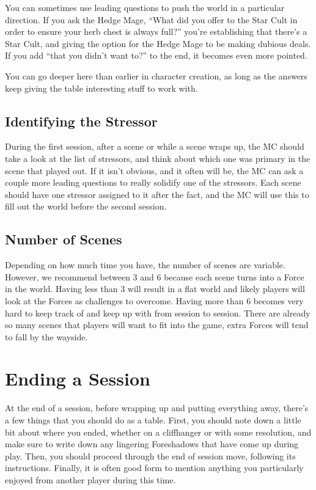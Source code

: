 \documentclass[
]{memoir}
\begin{document}
You can sometimes use leading questions to push the world in a
particular direction. If you ask the Hedge Mage, ``What did you offer to
the Star Cult in order to ensure your herb chest is always full?''
you're establishing that there's a Star Cult, and giving the option for
the Hedge Mage to be making dubious deals. If you add ``that you didn't
want to?'' to the end, it becomes even more pointed.

You can go deeper here than earlier in character creation, as long as
the answers keep giving the table interesting stuff to work with.

\hypertarget{identifying-the-stressor}{%
\subsection{Identifying the Stressor}\label{identifying-the-stressor}}

During the first session, after a scene or while a scene wraps up, the
MC should take a look at the list of stressors, and think about which
one was primary in the scene that played out. If it isn't obvious, and
it often will be, the MC can ask a couple more leading questions to
really solidify one of the stressors. Each scene should have one
stressor assigned to it after the fact, and the MC will use this to fill
out the world before the second session.

\hypertarget{number-of-scenes}{%
\subsection{Number of Scenes}\label{number-of-scenes}}

Depending on how much time you have, the number of scenes are variable.
However, we recommend between 3 and 6 because each scene turns into a
Force in the world. Having less than 3 will result in a flat world and
likely players will look at the Forces as challenges to overcome. Having
more than 6 becomes very hard to keep track of and keep up with from
session to session. There are already so many scenes that players will
want to fit into the game, extra Forces will tend to fall by the
wayside.

\hypertarget{ending-a-session-1}{%
\section{Ending a Session}\label{ending-a-session-1}}

At the end of a session, before wrapping up and putting everything away,
there's a few things that you should do as a table. First, you should
note down a little bit about where you ended, whether on a cliffhanger
or with some resolution, and make sure to write down any lingering
Foreshadows that have come up during play. Then, you should proceed
through the end of session move, following its instructions. Finally, it
is often good form to mention anything you particularly enjoyed from
another player during this time.
\end{document}
